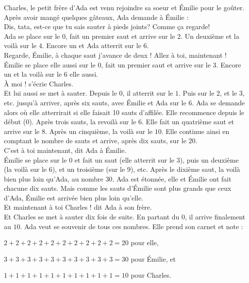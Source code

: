 Charles, le petit frère d'Ada est venu rejoindre sa soeur et Émilie pour le goûter. Après avoir mangé quelques gâteaux, Ada demande à Émilie : \\
\guillemotleft Dis, tata, est-ce que tu sais sauter à pieds joints? Comme ça regarde! \guillemotright\\
Ada se place sur le $0$, fait un premier saut et arrive sur le $2$. Un deuxième et la voilà sur le $4$. Encore un et Ada atterrit sur le $6$.\\
\guillemotleft Regarde, Émilie, à chaque saut j’avance de deux ! Allez à toi, maintenant ! \guillemotright\\
Émilie se place elle aussi sur le $0$, fait un premier saut et arrive sur le $3$. Encore un et la voilà sur le $6$ elle aussi. \\
\guillemotleft À moi ! s'écrie Charles. \guillemotright\\
Et lui aussi se met à sauter. Depuis le $0$, il atterrit sur le $1$. Puis sur le $2$, et le $3$, etc. jusqu'à arriver, après six sauts, avec Émilie et Ada sur le $6$.
Ada se demande alors où elle atterrirait si elle faisait 10 sauts d'affilée. 
Elle recommence depuis le début ($0$). Après trois sauts, la revoilà sur le $6$. 
Elle fait un quatrième saut et arrive sur le $8$. 
Après un cinquième, la voilà sur le $10$. Elle continue ainsi en comptant le nombre de sauts et arrive, après dix sauts, sur le $20$. \\
\guillemotleft C’est à toi maintenant, dit Ada à Émilie. \guillemotright\\
Émilie se place sur le $0$ et fait un saut (elle atterrit sur le $3$), puis un deuxième (la voilà sur le $6$), et un troisième (sur le $9$), etc. Après le dixième saut, la voilà bien plus loin qu’Ada, au nombre $30$.
Ada est étonnée, elle et Émilie ont fait chacune dix sauts. Mais comme les sauts d’Émilie sont plus grands que ceux d’Ada, Émilie est arrivée bien plus loin qu’elle.\\ 
\guillemotleft Et maintenant à toi Charles ! dit Ada à son frère. \guillemotright\\
Et Charles se met à sauter dix fois de suite. En partant du $0$, il arrive finalement au $10$.
Ada veut se souvenir de tous ces nombres. Elle prend son carnet et note :
\begin{description}[leftmargin=0.5cm]
    \item $2+2+2+2+2+2+2+2+2+2=20$ pour elle,
    \item $3+3+3+3+3+3+3+3+3+3=30$ pour Émilie, et
    \item $1+1+1+1+1+1+1+1+1+1=10$ pour Charles.
\end{description}
